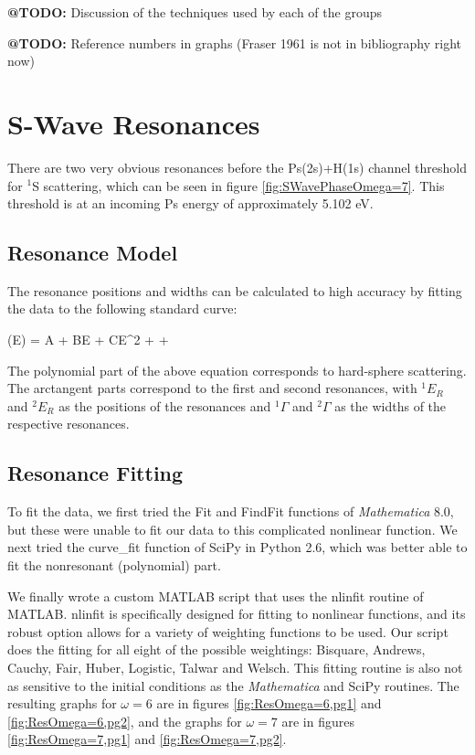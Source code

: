 \documentclass[Dissertation.tex]{subfiles}
\begin{document}
\textbf{@TODO:} Discussion of the techniques used by each of the groups

\textbf{@TODO:} Reference numbers in graphs (Fraser 1961 \cite{Fraser1961a} is not in bibliography right now)



\section{S-Wave Resonances}
\label{sec:SWaveResonances}

There are two very obvious resonances before the Ps(2s)+H(1s) channel threshold for $^1$S scattering, which can be seen in figure \ref{fig:SWavePhaseOmega=7}.  This threshold is at an incoming Ps energy of approximately 5.102 eV.  

\subsection{Resonance Model}
\label{sec:ResonanceModel}
The resonance positions and widths can be calculated to high accuracy by fitting the data to the following standard curve:

\beq
\label{eq:ResonanceCurve}
\delta(E) = A + BE + CE^2 + \arctan{} + \arctan{}
\eeq

\noindent The polynomial part of the above equation corresponds to hard-sphere scattering.  The arctangent parts correspond to the first and second resonances, with $^1E_R$ and $^2E_R$ as the positions of the resonances and $^1\Gamma$ and $^2\Gamma$ as the widths of the respective resonances.

\subsection{Resonance Fitting}
\label{sec:ResonanceFit}
To fit the data, we first tried the Fit and FindFit functions of \textit{Mathematica} 8.0, but these were unable to fit our data to this complicated nonlinear function.  We next tried the curve\_fit function of SciPy in Python 2.6, which was better able to fit the nonresonant (polynomial) part.

We finally wrote a custom MATLAB script that uses the nlinfit routine of MATLAB.  nlinfit is specifically designed for fitting to nonlinear functions, and its robust option allows for a variety of weighting functions to be used.  Our script does the fitting for all eight of the possible weightings: Bisquare, Andrews, Cauchy, Fair, Huber, Logistic, Talwar and Welsch.  This fitting routine is also not as sensitive to the initial conditions as the \textit{Mathematica} and SciPy routines.  The resulting graphs for $\omega = 6$ are in figures \ref{fig:ResOmega=6,pg1} and \ref{fig:ResOmega=6,pg2}, and the graphs for $\omega = 7$ are in figures \ref{fig:ResOmega=7,pg1} and \ref{fig:ResOmega=7,pg2}.
\end{document}

